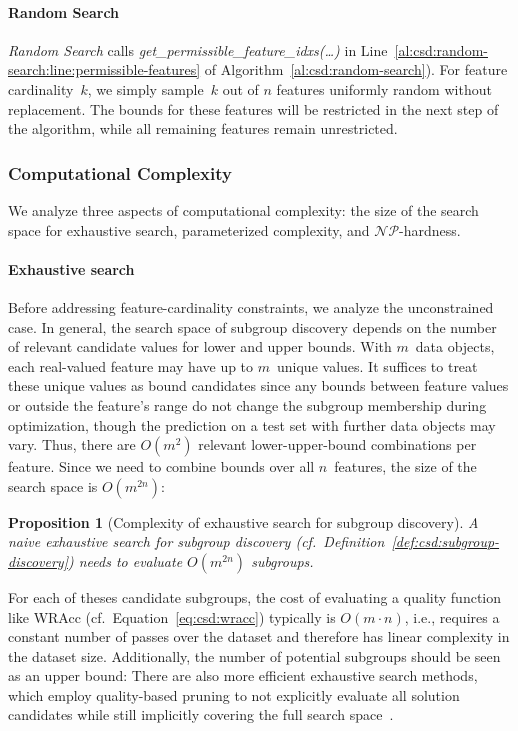 \documentclass{article}
\newtheorem{proposition}{Proposition}
\theoremstyle{definition}
\begin{document}
\paragraph{Random Search}

\emph{Random Search} calls \emph{get\_permissible\_feature\_idxs(\dots)} in Line~\ref{al:csd:random-search:line:permissible-features} of Algorithm~\ref{al:csd:random-search}).
For feature cardinality~$k$, we simply sample~$k$ out of $n$ features uniformly random without replacement.
The bounds for these features will be restricted in the next step of the algorithm, while all remaining features remain unrestricted.

\subsubsection{Computational Complexity}
\label{sec:csd:approach:cardinality:complexity}

We analyze three aspects of computational complexity:
the size of the search space for exhaustive search, parameterized complexity, and $\mathcal{NP}$-hardness.

\paragraph{Exhaustive search}

Before addressing feature-cardinality constraints, we analyze the unconstrained case.
In general, the search space of subgroup discovery depends on the number of relevant candidate values for lower and upper bounds.
With $m$~data objects, each real-valued feature may have up to $m$~unique values.
It suffices to treat these unique values as bound candidates since any bounds between feature values or outside the feature's range do not change the subgroup membership during optimization, though the prediction on a test set with further data objects may vary.
Thus, there are $O(m^2)$ relevant lower-upper-bound combinations per feature.
Since we need to combine bounds over all $n$~features, the size of the search space is $O(m^{2n})$:
%
\begin{proposition}[Complexity of exhaustive search for subgroup discovery]
	A naive exhaustive search for subgroup discovery (cf.~Definition~\ref{def:csd:subgroup-discovery}) needs to evaluate $O(m^{2n})$ subgroups.
	\label{prop:csd:complexity-unconstrained-exhaustive}
\end{proposition}
%
For each of theses candidate subgroups, the cost of evaluating a quality function like WRAcc (cf.~Equation~\ref{eq:csd:wracc}) typically is $O(m \cdot n)$, i.e., requires a constant number of passes over the dataset and therefore has linear complexity in the dataset size.
Additionally, the number of potential subgroups should be seen as an upper bound:
There are also more efficient exhaustive search methods, which employ quality-based pruning to not explicitly evaluate all solution candidates while still implicitly covering the full search space~\cite{atzmueller2015subgroup}.
\end{document}
